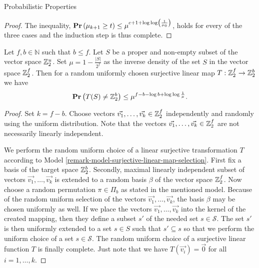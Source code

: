 \begin{section}{Probabilistic Properties}
\begin{proof}
The inequality, $\mathbf{Pr}\left(\mu_{k + 1} \geq t\right) \leq \mu ^ {c + 1 + \log \log \left( \frac{1}{\mu_0} \right)}$, holds for every of the three cases and the induction step is thus complete.
\end{proof}

\begin{theorem}
\label{theorem-linear-function-set-onto}
Let $f, b \in \mathbb{N}$ such that $b \leq f$. Let $S$ be a proper and non-empty subset of the vector space $\mathbb{Z}_{2}^{u}$. Set $\mu = 1 - \frac{|S|}{2 ^ f}$ as the inverse density of the set $S$ in the vector space $\mathbb{Z}_{2}^{f}$. Then for a random uniformly chosen surjective linear map $T: \mathbb{Z}_{2}^{f} \rightarrow \mathbb{Z}_{2}^{b}$ we have
\[
	\mathbf{Pr}\left(T(S) \neq \mathbb{Z}_{2}^{b}\right) \leq \mu^{f - b - \log b + \log \log \frac{1}{\mu}} \text{.}
\]
\end{theorem}
\begin{proof}
Set $k = f - b$. Choose vectors $\vec{v_1}, \dots, \vec{v_k} \in \mathbb{Z}_{2}^{f}$ independently and randomly using the uniform distribution. Note that the vectors $\vec{v_1}, \dots, \vec{v_k} \in \mathbb{Z}_{2}^{f}$ are not necessarily linearly independent.

We perform the random uniform choice of a linear surjective transformation $T$ according to Model \ref{remark-model-surjective-linear-map-selection}. First fix a basis of the target space $\mathbb{Z}_{2}^{b}$. Secondly, maximal linearly independent subset of vectors $\vec{v_1}, \dots, \vec{v_k}$ is extended to a random basis $\beta$ of the vector space $\mathbb{Z}_{2}^{f}$. Now choose a random permutation $\pi \in \Pi_b$ as stated in the mentioned model. Because of the random uniform selection of the vectors $\vec{v_1}, \dots, \vec{v_k}$, the basis $\beta$ may be chosen uniformly as well. If we place the vectors $\vec{v_1}, \dots, \vec{v_k}$ into the kernel of the created mapping, then they define a subset $s'$ of the needed set $s \in \mathcal{S}$. The set $s'$ is then uniformly extended to a set $s \in S$ such that $s' \subseteq s$ so that we perform the uniform choice of a set $s \in \mathcal{S}$. The random uniform choice of a surjective linear function $T$ is finally complete. Just note that we have $T(\vec{v_i}) = \vec{0}$ for all $i = 1, \dots, k$.	


\end{proof}
\end{section}
